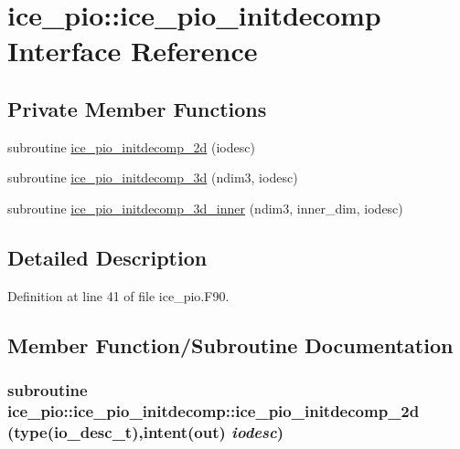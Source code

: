 \hypertarget{interfaceice__pio_1_1ice__pio__initdecomp}{
\section{ice\_\-pio::ice\_\-pio\_\-initdecomp Interface Reference}
\label{interfaceice__pio_1_1ice__pio__initdecomp}
}
\subsection*{Private Member Functions}
\begin{DoxyCompactItemize}
\item 
subroutine \hyperlink{interfaceice__pio_1_1ice__pio__initdecomp_ac8c12eb5a83ecf140f77f3570ee0f3a7}{ice\_\-pio\_\-initdecomp\_\-2d} (iodesc)
\item 
subroutine \hyperlink{interfaceice__pio_1_1ice__pio__initdecomp_ab55d8fe89230d56d405d243986283c3e}{ice\_\-pio\_\-initdecomp\_\-3d} (ndim3, iodesc)
\item 
subroutine \hyperlink{interfaceice__pio_1_1ice__pio__initdecomp_a2041a5782b522f05deebacd7ae7a47b8}{ice\_\-pio\_\-initdecomp\_\-3d\_\-inner} (ndim3, inner\_\-dim, iodesc)
\end{DoxyCompactItemize}


\subsection{Detailed Description}


Definition at line 41 of file ice\_\-pio.F90.

\subsection{Member Function/Subroutine Documentation}
\hypertarget{interfaceice__pio_1_1ice__pio__initdecomp_ac8c12eb5a83ecf140f77f3570ee0f3a7}{
\subsubsection[{ice\_\-pio\_\-initdecomp\_\-2d}]{\setlength{\rightskip}{0pt plus 5cm}subroutine ice\_\-pio::ice\_\-pio\_\-initdecomp::ice\_\-pio\_\-initdecomp\_\-2d (type(io\_\-desc\_\-t),intent(out) {\em iodesc})}}
\label{interfaceice__pio_1_1ice__pio__initdecomp_ac8c12eb5a83ecf140f77f3570ee0f3a7}


